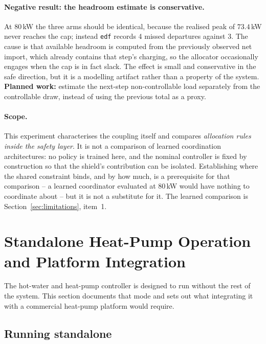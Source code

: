 \documentclass[11pt]{article}
\begin{document}
\paragraph{Negative result: the headroom estimate is conservative.} At 80\,kW the
three arms should be identical, because the realised peak of $73.4$\,kW never
reaches the cap; instead \texttt{edf} records 4 missed departures against 3. The
cause is that available headroom is computed from the previously observed net
import, which already contains that step's charging, so the allocator
occasionally engages when the cap is in fact slack. The effect is small and
conservative in the safe direction, but it is a modelling artifact rather than a
property of the system. \textbf{Planned work:} estimate the next-step
non-controllable load separately from the controllable draw, instead of using the
previous total as a proxy.

\paragraph{Scope.} This experiment characterises the coupling itself and compares
\emph{allocation rules inside the safety layer}. It is not a comparison of
learned coordination architectures: no policy is trained here, and the nominal
controller is fixed by construction so that the shield's contribution can be
isolated. Establishing where the shared constraint binds, and by how much, is a
prerequisite for that comparison -- a learned coordinator evaluated at 80\,kW
would have nothing to coordinate about -- but it is not a substitute for it. The
learned comparison is Section~\ref{sec:limitations}, item~1.

\section{Standalone Heat-Pump Operation and Platform Integration}
\label{sec:standalone}

The hot-water and heat-pump controller is designed to run without the rest of the
system. This section documents that mode and sets out what integrating it with a
commercial heat-pump platform would require.

\subsection{Running standalone}
\end{document}
